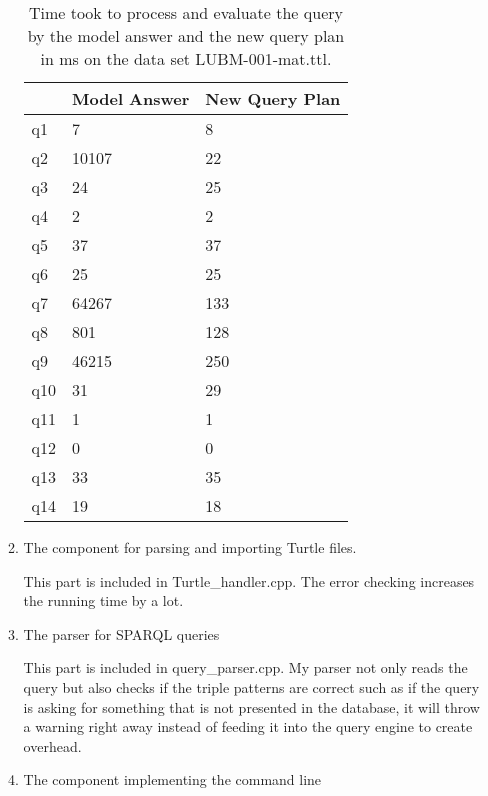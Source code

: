 \documentclass{article}
\begin{document}
\begin{enumerate}
\begin{enumerate}
\begin{table}[]\centering
\begin{tabular}{|l|l|l|}
\hline
    & Model Answer & New Query Plan \\ \hline
q1  & 7            & 8              \\ \hline
q2  & 10107        & 22             \\ \hline
q3  & 24           & 25             \\ \hline
q4  & 2            & 2              \\ \hline
q5  & 37           & 37             \\ \hline
q6  & 25           & 25             \\ \hline
q7  & 64267        & 133            \\ \hline
q8  & 801          & 128            \\ \hline
q9  & 46215        & 250            \\ \hline
q10 & 31           & 29             \\ \hline
q11 & 1            & 1              \\ \hline
q12 & 0            & 0              \\ \hline
q13 & 33           & 35             \\ \hline
q14 & 19           & 18             \\ \hline
\end{tabular}
\caption{Time took to process and evaluate the query by the model answer and the new query plan in ms on the data set LUBM-001-mat.ttl.}
\end{table}

\item The component for parsing and importing Turtle files.

This part is included in Turtle\_handler.cpp. The error checking increases the running time by a lot. 

\item The parser for SPARQL queries

This part is included in query\_parser.cpp. My parser not only reads the query but also checks if the triple patterns are correct such as if the query is asking for something that is not presented in the database, it will throw a warning right away instead of feeding it into the query engine to create overhead. 

\item The component implementing the command line


\end{enumerate}
\end{enumerate}
\end{document}
